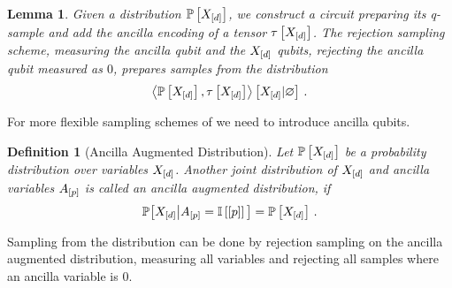 \documentclass[aps,onecolumn,nofootinbib,pra]{article}
\newtheorem{lemma}{Lemma}
\newtheorem{definition}{Definition}
\newcommand{\red}[1]{\textcolor{red}{#1}}
\begin{document}
    \begin{lemma}
        Given a distribution $\mathbb{P}\left[X_{[d]}\right]$, we construct a circuit preparing its q-sample and add the ancilla encoding of a tensor $\tau\left[X_{[d]}\right]$.
        The rejection sampling scheme, measuring the ancilla qubit and the $X_{[d]}$ qubits, rejecting the ancilla qubit measured as $0$, prepares samples from the distribution
        \begin{align*}
            \left\langle \mathbb{P}\left[X_{[d]}\right],\tau\left[X_{[d]}\right]\right\rangle \left[ X_{[d]} | \varnothing \right] \, .
        \end{align*}
    \end{lemma}

    For more flexible sampling schemes of \ComputationActivationNetworks{} we need to introduce ancilla qubits.

    \begin{definition}[Ancilla Augmented Distribution]
        Let $\mathbb{P}\left[X_{[d]}\right]$ be a probability distribution over variables $X_{[d]}$.
        Another joint distribution of $X_{[d]}$ and ancilla variables $A_{[p]}$ is called an ancilla augmented distribution, if
        \begin{align*}
            \mathbb{P}\big[X_{[d]}\big|A_{[p]}=\mathbb{I}\left[[p]\right]\big] = \mathbb{P}\left[X_{[d]}\right] \, .
        \end{align*}
    \end{definition}

    Sampling from the distribution can be done by rejection sampling on the ancilla augmented distribution, measuring all variables and rejecting all samples where an ancilla variable is $0$.

\end{document}
